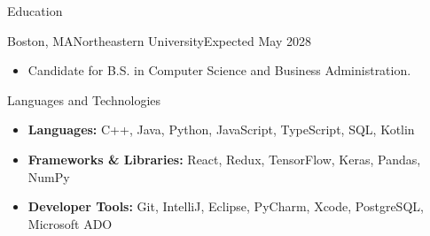 \documentclass[]{mcdowellcv}
\begin{document}
	\makeheader
	\begin{cvsection}{Education}
		\begin{cvsubsection}{Boston, MA}{Northeastern University}{Expected May 2028}
			\begin{itemize}
				\item Candidate for B.S. in Computer Science and Business Administration.
			\end{itemize}
		\end{cvsubsection}
	\end{cvsection}
		\begin{cvsection}{Languages and Technologies}
		\begin{cvsubsection}{}{}{}	
			\begin{itemize}
				\item \textbf{Languages:} C++, Java, Python, JavaScript, TypeScript, SQL, Kotlin
				\item \textbf{Frameworks \& Libraries:} React, Redux, TensorFlow, Keras, Pandas, NumPy
				\item \textbf{Developer Tools:} Git, IntelliJ, Eclipse, PyCharm, Xcode, PostgreSQL, Microsoft ADO
			\end{itemize}
		\end{cvsubsection}
	\end{cvsection}
\end{document}
